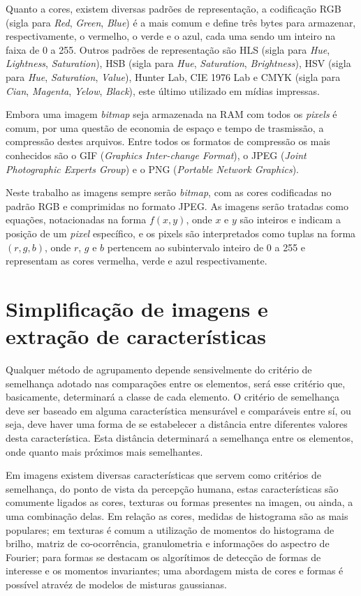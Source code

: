 Quanto a cores, existem diversas padrões de representação, a
codificação RGB (sigla para \textit{Red},
\textit{Green}, \textit{Blue}) é a mais comum e define três bytes para armazenar,
respectivamente, o vermelho, o verde e o azul, cada uma sendo um inteiro na
faixa de 0 a 255. Outros padrões de representação são HLS
(sigla para \textit{Hue}, \textit{Lightness}, \textit{Saturation}),
HSB (sigla para \textit{Hue}, \textit{Saturation}, \textit{Brightness}),
HSV (sigla para \textit{Hue}, \textit{Saturation}, \textit{Value}), Hunter Lab,
CIE 1976 Lab e CMYK (sigla para \textit{Cian}, \textit{Magenta},
\textit{Yelow}, \textit{Black}), este último utilizado em mídias impressas.

Embora uma imagem \textit{bitmap} seja armazenada na RAM com todos os \textit{pixels} é comum,
por uma questão de economia de espaço e tempo de trasmissão, a compressão destes
arquivos. Entre todos os formatos de compressão os mais conhecidos são o GIF
(\textit{Graphics Inter-change Format}), o JPEG
(\textit{Joint Photographic Experts Group}) e
o PNG (\textit{Portable Network Graphics}).

Neste trabalho as imagens sempre serão \textit{bitmap}, com as cores codificadas
no padrão RGB e comprimidas no formato JPEG. As imagens serão tratadas como
equações, notacionadas na forma $ f(x,y) $, onde $ x $ e $ y $ são inteiros e indicam a
posição de um \textit{pixel} específico, e os pixels são interpretados como tuplas na
forma $ (r, g, b) $, onde $ r $, $ g $ e $ b $ pertencem ao subintervalo inteiro
de 0 a 255 e representam as cores vermelha, verde e azul respectivamente.

\section{Simplificação de imagens e extração de características}\label{sec:simplificacao_img}

Qualquer método de agrupamento depende sensivelmente do critério de semelhança
adotado nas comparações entre os elementos, será esse critério que, basicamente,
determinará a classe de cada elemento. O critério de semelhança deve ser baseado
em alguma característica mensurável e comparáveis entre sí, ou seja, deve haver
uma forma de se estabelecer a distância entre diferentes valores desta característica.
Esta distância determinará a semelhança entre os elementos, onde
quanto mais próximos mais semelhantes.

Em imagens existem diversas características que servem como critérios de
semelhança, do ponto de vista da percepção humana, estas características são
comumente ligados as cores, texturas ou formas presentes na imagen, ou ainda,
a uma combinação delas. Em relação as cores, medidas de histograma são as mais
populares; em texturas é comum a utilização de momentos do histograma de brilho,
matriz de co-ocorrência, granulometria e informações do aspectro de Fourier;
para formas se destacam os algorítimos de detecção de formas de interesse e os
momentos invariantes; uma abordagem mista de cores e formas é possível atravéz
de modelos de misturas gaussianas.

